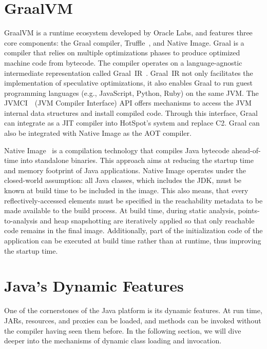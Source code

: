 \section{GraalVM}
GraalVM is a runtime ecosystem developed by Oracle Labs, and features three core components: the Graal compiler, Truffle~\cite{noauthor_truffle_nodate}, and Native Image.
Graal is a compiler that relies on multiple optimizations phases to produce optimized machine code from bytecode. The compiler operates on a language-agnostic intermediate representation called Graal~IR~\cite{duboscq_graal_2013}. Graal~IR not only facilitates the implementation of speculative optimizations, it also enables Graal to run guest programming languages (e.g., JavaScript, Python, Ruby) on the same JVM. 
The JVMCI~\cite{noauthor_jep_nodate}~(JVM Compiler Interface) API offers mechanisms to access the JVM internal data structures and install compiled code. Through this interface, Graal can integrate as a JIT compiler into HotSpot's system and replace C2. 
Graal can also be integrated with Native Image as the AOT compiler.

Native Image~\cite{wimmer_initialize_2019} is a compilation technology that compiles Java bytecode ahead-of-time into standalone binaries. This approach aims at reducing the startup time and memory footprint of Java applications. Native Image operates under the closed-world assumption: all Java classes, which includes the JDK, must be known at build time to be included in the image.
This also means, that every reflectively-accessed elements must be specified in the reachability metadata to be made available to the build process. 
At build time, during static analysis, points-to-analysis and heap snapshotting are iteratively applied so that only reachable code remains in the final image. Additionally, part of the initialization code of the application can be executed at build time rather than at runtime, thus improving the startup time.

\section{Java's Dynamic Features}
One of the cornerstones of the Java platform is its dynamic features. At run time, JARs, resources, and proxies can be loaded, and methods can be invoked without the compiler having seen them before. In the following section, we will dive deeper into the mechanisms of dynamic class loading and invocation.

